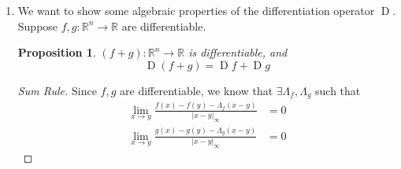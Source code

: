 \documentclass[letterpaper,11pt]{article}
\newtheorem{prop}{Proposition}
\DeclareMathOperator{\D}{D}
\newcommand{\R}{\mathbb{R}}
\newcommand{\norm}[1]{\left|#1\right|}
\newcommand{\inftynorm}[1]{\norm{#1}_\infty}
\begin{document}
\begin{enumerate}
\begin{enumerate}
\begin{proof}
                    Because the derivative changes sign, this indicates a local
                    minimum or maximum in the function $f$. In a neighbourhood
                    of these extrema, the Intermediate Value Theorem guarantees
                    that we will have the same $y$ value to the left and to the
                    right of the extremum, because $f$ is continuous.
                    Therefore, $f$ is not invertible on any interval containing
                    the origin.
                \end{proof}

            \item
                This does not contradict the Inverse Function Theorem. The
                theorem requires that the function be continuously
                differentiable on the domain in which to apply the theorem.
                However, $f^\prime(0) = \frac{1}{2}$ but
                $\lim_{x \to 0} {f^\prime(x)}$ does not exist (because the
                $\cos{}$ term does not approach a finite value as $x \to 0$).
                Hence, the Inverse Function Theorem does not apply.
        \end{enumerate}

    \item
        We want to show some algebraic properties of the differentiation
        operator $\D{}$. Suppose $f, g : \R^n \to \R$ are differentiable.

        \begin{prop}
            $(f + g) : \R^n \to \R$ is differentiable, and
            \begin{equation*}
                \D{(f + g)} = \D{f} + \D{g}
            \end{equation*}
        \end{prop}

        \begin{proof}[Sum Rule]
            Since $f, g$ are differentiable, we know that
            $\exists \Lambda_f, \Lambda_g$ such that
            \begin{align*}
                \lim_{x \to y} {
                    \frac{f(x) - f(y) - \Lambda_f (x - y)} {
                        \inftynorm{x - y}
                    }
                }
                &= 0 \\
                \lim_{x \to y} {
                    \frac{g(x) - g(y) - \Lambda_g (x - y)} {
                        \inftynorm{x - y}
                    }
                }
                &= 0
            \end{align*}


\end{proof}
\end{enumerate}
\end{document}
